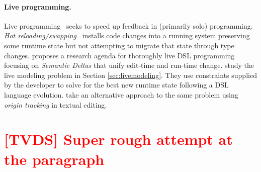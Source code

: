 \documentclass[english,submission]{programming}
\begin{document}
\paragraph{Live programming.}
Live programming~\cite{tanimoto90, rein2018exploratory} seeks to speed up feedback in (primarily solo) programming.
\emph{Hot reloading/swapping}~\cite{barenz2020essence, hicks2005dynamic} installs code changes into a running system preserving some runtime state but not attempting to migrate that state through type changes.
\citet{SemanticDeltas} proposes a research agenda for thoroughly live DSL programming focusing on \emph{Semantic Deltas} that unify edit-time and run-time change.
\citet{RuntimeConstraint} study the live modeling problem in Section \ref{sec:livemodeling}. They use constraints supplied by the developer to solve for the best new runtime state following a DSL language evolution. \citet{vanRozen19} take an alternative approach to the same problem using \emph{origin tracking} in textual editing.




%
%
\printbibliography



\section{\textcolor{red}{[TVDS] Super rough attempt at the paragraph}}
\end{document}

